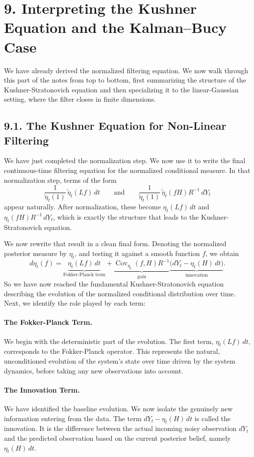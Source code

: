 \documentclass[11pt]{article}
\theoremstyle{definition}
\theoremstyle{remark}
\begin{document}
\section*{9. Interpreting the Kushner Equation and the Kalman--Bucy Case}
We have already derived the normalized filtering equation. We now walk through this part of the notes from top to bottom, first summarizing the structure of the Kushner-Stratonovich equation and then specializing it to the linear-Gaussian setting, where the filter closes in finite dimensions.

\subsection*{9.1. The Kushner Equation for Non-Linear Filtering}
We have just completed the normalization step. We now use it to write the final continuous-time filtering equation for the normalized conditional measure. In that normalization step, terms of the form
\[
\frac{1}{\tilde \eta_t(1)}\,\tilde \eta_t(Lf)\,dt
\qquad\text{and}\qquad
\frac{1}{\tilde \eta_t(1)}\,\tilde \eta_t(fH)R^{-1}\,dY_t
\]
appear naturally. After normalization, these become $\eta_t(Lf)\,dt$ and $\eta_t(fH)R^{-1}\,dY_t$, which is exactly the structure that leads to the Kushner-Stratonovich equation.

We now rewrite that result in a clean final form. Denoting the normalized posterior measure by $\eta_t$, and testing it against a smooth function $f$, we obtain
\[
d\eta_t(f)=\underbrace{\eta_t(Lf)\,dt}_{\text{Fokker-Planck term}}+\underbrace{\operatorname{Cov}_{\eta_t}(f,H)R^{-1}}_{\text{gain}}\underbrace{\bigl(dY_t-\eta_t(H)\,dt\bigr)}_{\text{innovation}}.
\]
So we have now reached the fundamental Kushner-Stratonovich equation describing the evolution of the normalized conditional distribution over time. Next, we identify the role played by each term:

\paragraph{The Fokker-Planck Term.}
We begin with the deterministic part of the evolution. The first term, $\eta_t(Lf)\,dt$, corresponds to the Fokker-Planck operator. This represents the natural, unconditioned evolution of the system's state over time driven by the system dynamics, before taking any new observations into account.

\paragraph{The Innovation Term.}
We have identified the baseline evolution. We now isolate the genuinely new information entering from the data. The term $dY_t-\eta_t(H)\,dt$ is called the innovation. It is the difference between the actual incoming noisy observation $dY_t$ and the predicted observation based on the current posterior belief, namely $\eta_t(H)\,dt$.
\end{document}
